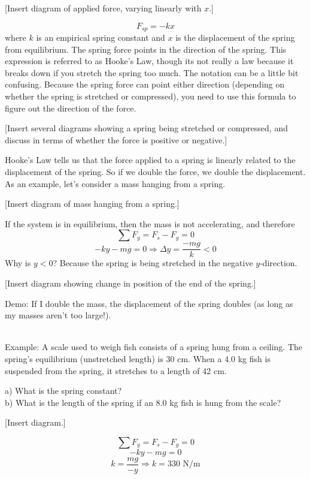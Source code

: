 [Insert diagram of applied force, varying linearly with $x$.]
\vspace{5cm}

$$\boxed{F_{sp}=-kx}$$
where $k$ is an empirical spring constant and $x$ is the displacement of the spring from equilibrium. The spring force points in the direction of the spring. This expression is referred to as Hooke's Law, though its not really a law because it breaks down if you stretch the spring too much. The notation can be a little bit confusing. Because the spring force can point either direction (depending on whether the spring is stretched or compressed), you need to use this formula to figure out the direction of the force.

[Insert several diagrams showing a spring being stretched or compressed, and discuss in terms of whether the force is positive or negative.]
\vspace{5cm}

Hooke's Law tells us that the force applied to a spring is linearly related to the displacement of the spring. So if we double the force, we double the displacement. As an example, let's consider a mass hanging from a spring.

[Insert diagram of mass hanging from a spring.]
\vspace{5cm}

If the system is in equilibrium, then the mass is not accelerating, and therefore
$$\sum F_y = F_s-F_g=0$$
$$-ky-mg=0\Rightarrow \Delta{y}=\frac{-mg}{k}<0$$
Why is $y<0$? Because the spring is being stretched in the negative $y$-direction.

[Insert diagram showing change in position of the end of the spring.]
\vspace{5cm}

Demo: If I double the mass, the displacement of the spring doubles (as long as my masses aren't too large!).

\hrulefill\\
Example: A scale used to weigh fish consists of a spring hung from a ceiling. The spring's equilibrium (unstretched length) is 30 cm. When a 4.0 kg fish is suspended from the spring, it stretches to a length of 42 cm.

a) What is the spring constant?\\
b) What is the length of the spring if an 8.0 kg fish is hung from the scale?

[Insert diagram.]
\vspace{5cm}

$$\sum F_y=F_s-F_g=0$$
$$-ky-mg=0$$
$$k=\frac{mg}{-{y}}\Rightarrow \boxed{k=330\mbox{ N/m}}$$

